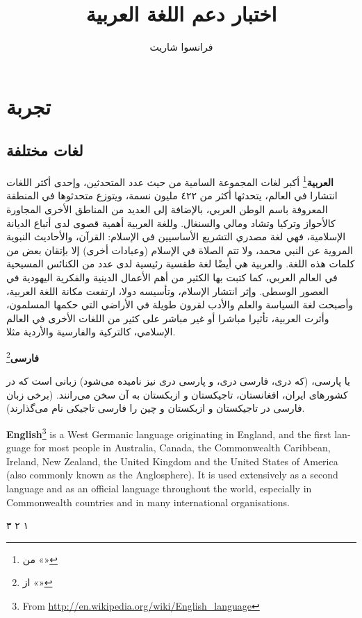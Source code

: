 \documentclass[a4paper]{book}%
\title{اختبار دعم اللغة العربية}
\author{فرانسوا شاريت}
\begin{document}
\maketitle
\tableofcontents
\chapter{تجربة}
\section{لغات مختلفة}


\textbf{العربية}\footnote{%
من «»} 
أكبر لغات المجموعة السامية من حيث عدد المتحدثين، وإحدى أكثر اللغات انتشارا في
العالم، يتحدثها أكثر من ٤٢٢ مليون نسمة، ويتوزع متحدثوها في المنطقة المعروفة
باسم الوطن العربي، بالإضافة إلى العديد من المناطق الأخرى المجاورة كالأحواز وتركيا
وتشاد ومالي والسنغال. وللغة العربية أهمية قصوى لدى أتباع الديانة الإسلامية، فهي
لغة مصدري التشريع الأساسيين في الإسلام: القرآن، والأحاديث النبوية المروية عن النبي
محمد، ولا تتم الصلاة في الإسلام (وعبادات أخرى) إلا بإتقان بعض من كلمات هذه اللغة.
والعربية هي أيضًا لغة طقسية رئيسية لدى عدد من الكنائس المسيحية في العالم العربي،
كما كتبت بها الكثير من أهم الأعمال الدينية والفكرية اليهودية في العصور الوسطى.
وإثر انتشار الإسلام، وتأسيسه دولا، ارتفعت مكانة اللغة العربية، وأصبحت لغة السياسة
والعلم والأدب لقرون طويلة في الأراضي التي حكمها المسلمون، وأثرت العربية، تأثيرا
مباشرا أو غير مباشر على كثير من اللغات الأخرى في العالم الإسلامي، كالتركية
والفارسية والأردية مثلا.

\textfarsi{\bfseries فارسی}\footnote{%
از «»}
\begin{farsi}
یا پارسی، (که دری، فارسی دری، و پارسی دری نیز نامیده می‌شود) زبانی است که
در کشورهای ایران، افغانستان، تاجیکستان و ازبکستان به آن سخن می‌رانند.
(برخی زبان فارسی در تاجیکستان و ازبکستان و چین را فارسی تاجیکی نام
می‌گذارند).  
\end{farsi}

\newpage
\begin{english}
\textbf{English}\footnote{%
	From \url{http://en.wikipedia.org/wiki/English_language}} 
is a West Germanic language originating in England, and the first language for
most people in Australia, Canada, the Commonwealth Caribbean, Ireland, New
Zealand, the United Kingdom and the United States of America (also commonly
known as the Anglosphere). It is used extensively as a second language and as
an official language throughout the world, especially in Commonwealth countries
and in many international organisations.

\textarabic{١ ٢ ٣}

\end{english}
\clearpage
\end{document}
